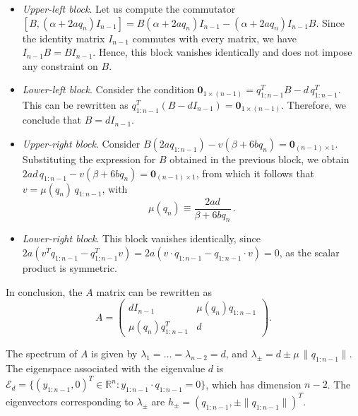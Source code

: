\documentclass{rendiconti}
\begin{document}
\begin{itemize}
\item \textit{Upper-left block}.  
Let us compute the commutator
$[B,(\alpha+2a q_n)I_{n-1}] = B(\alpha+2a q_n)I_{n-1} - (\alpha+2a q_n)I_{n-1}B$.
Since the identity matrix $I_{n-1}$ commutes with every matrix, we have
$I_{n-1}B=BI_{n-1}$.
Hence, this block vanishes identically and does not impose any constraint on $B$.
\item \textit{Lower-left block}.  
Consider the condition $\mathbf{0}_{1\times(n-1)} = q_{1:n-1}^T B - d\,q_{1:n-1}^T$.
This can be rewritten as
$q_{1:n-1}^T(B-dI_{n-1})=\mathbf{0}_{1\times(n-1)}$.
Therefore, we conclude that $B=dI_{n-1}$.
\item \textit{Upper-right block}.  
Consider $B(2a q_{1:n-1}) - v(\beta + 6b q_n) = \mathbf{0}_{(n-1)\times1}$.
Substituting the expression for $B$ obtained in the previous block, we obtain
$2ad\,q_{1:n-1} - v(\beta + 6b q_n) = \mathbf{0}_{(n-1)\times1}$,
from which it follows that $v=\mu(q_n)\,q_{1:n-1}$, with
\begin{equation}
\label{eq:mu}
\mu(q_n)\equiv \frac{2ad}{\beta+6bq_n}\,.
\end{equation}
\item \textit{Lower-right block}.  
This block vanishes identically, since
$2a(v^T q_{1:n-1} - q_{1:n-1}^T v)
= 2a(v\cdot q_{1:n-1} - q_{1:n-1}\cdot v)=0$,
as the scalar product is symmetric.
\end{itemize}
In conclusion, the $A$ matrix can be rewritten as
\begin{equation}
A = 
\begin{pmatrix}
dI_{n-1} & \mu(q_n) q_{1:n-1} \\
\mu(q_n) q_{1:n-1}^T & d
\end{pmatrix}.
\end{equation}
%
\begin{proposition}
\label{prop:avlavtHH}
The spectrum of $A$ is given by
$\lambda_1=\dots=\lambda_{n-2}=d$,
and
$\lambda_\pm=d\pm\mu\,\|q_{1:n-1}\|$.
The eigenspace associated with the eigenvalue $d$ is
$\mathcal{E}_d=\{(y_{1:n-1},0)^T\in\mathbb{R}^n : y_{1:n-1}\cdot q_{1:n-1}=0\}$,
which has dimension $n-2$.
The eigenvectors corresponding to $\lambda_\pm$ are
$h_\pm=(q_{1:n-1},\pm\|q_{1:n-1}\|)^T$.
\end{proposition}
\end{document}
